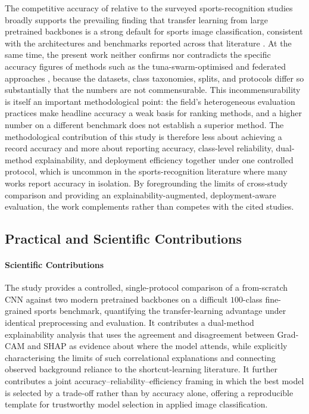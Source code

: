 The competitive accuracy of \bestModel{} relative to the surveyed sports-recognition studies broadly supports the prevailing finding that transfer learning from large pretrained backbones is a strong default for sports image classification, consistent with the architectures and benchmarks reported across that literature \citep{li2024seres,liu2024comparison,bera2023finegrained,ray2025womensports}.
At the same time, the present work neither confirms nor contradicts the specific accuracy figures of methods such as the tuna-swarm-optimised and federated approaches \citep{zhou2024tuna,fu2024federated}, because the datasets, class taxonomies, splits, and protocols differ so substantially that the numbers are not commensurable.
This incommensurability is itself an important methodological point: the field's heterogeneous evaluation practices make headline accuracy a weak basis for ranking methods, and a higher number on a different benchmark does not establish a superior method.
The methodological contribution of this study is therefore less about achieving a record accuracy and more about reporting accuracy, class-level reliability, dual-method explainability, and deployment efficiency together under one controlled protocol, which is uncommon in the sports-recognition literature where many works report accuracy in isolation.
By foregrounding the limits of cross-study comparison and providing an explainability-augmented, deployment-aware evaluation, the work complements rather than competes with the cited studies.

\subsection{Practical and Scientific Contributions}
\label{subsec:disc-contributions}

\paragraph{Scientific Contributions}
The study provides a controlled, single-protocol comparison of a from-scratch CNN against two modern pretrained backbones on a difficult $100$-class fine-grained sports benchmark, quantifying the transfer-learning advantage under identical preprocessing and evaluation.
It contributes a dual-method explainability analysis that uses the agreement and disagreement between Grad-CAM and SHAP as evidence about where the model attends, while explicitly characterising the limits of such correlational explanations and connecting observed background reliance to the shortcut-learning literature.
It further contributes a joint accuracy--reliability--efficiency framing in which the best model is selected by a trade-off rather than by accuracy alone, offering a reproducible template for trustworthy model selection in applied image classification.

